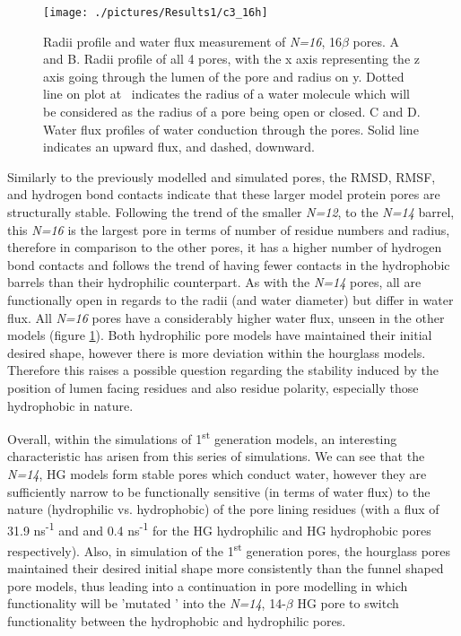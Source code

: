 \begin{figure}[H]
\begin{center}
\texttt{[image: ./pictures/Results1/c3\_16h]}
\caption[Radii profile and water flux measurement of \textit{N=16}, 16$\beta$ pores.] {Radii profile and water flux measurement of \textit{N=16}, 16$\beta$ pores. A and B. Radii profile of all 4 pores, with the x axis representing the z axis going through the lumen of the pore and radius on y. Dotted line on plot at  \angstrom\ indicates the radius of a water molecule which will be considered as the radius of a pore being open or closed. C and D. Water flux profiles of water conduction through the pores. Solid line indicates an upward flux, and dashed, downward.}
\label{fig:c3_16h}
\end{center}
\end{figure}


Similarly to the previously modelled and simulated pores, the RMSD, RMSF, and hydrogen bond contacts indicate that these larger model protein pores are structurally stable. Following the trend of the smaller \textit{N=12}, to the \textit{N=14} barrel, this \textit{N=16} is the largest pore in terms of number of residue numbers and radius, therefore in comparison to the other pores, it has a higher number of hydrogen bond contacts and follows the trend of having fewer contacts in the hydrophobic barrels than their hydrophilic counterpart. As with the \textit{N=14} pores, all are functionally open in regards to the radii (and water diameter) but differ in water flux. All \textit{N=16} pores have a considerably higher water flux, unseen in the other models (figure \ref{fig:c3_16h}). Both hydrophilic pore models have maintained their initial desired shape, however there is more deviation within the hourglass models. Therefore this raises a possible question regarding the stability induced by the position of lumen facing residues and also residue polarity, especially those hydrophobic in nature. 

Overall, within the simulations of 1\textsuperscript{st} generation models, an interesting characteristic has arisen from this series of simulations. We can see that the \textit{N=14}, HG models form stable pores which conduct water, however they are sufficiently narrow to be functionally sensitive (in terms of water flux) to the nature (hydrophilic vs. hydrophobic) of the pore lining residues (with a flux of 31.9 ns\textsuperscript{-1} and and 0.4 ns\textsuperscript{-1} for the HG hydrophilic and HG hydrophobic pores respectively). Also, in simulation of the  1\textsuperscript{st} generation pores, the hourglass pores maintained their desired initial shape more consistently than the funnel shaped pore models, thus leading into a continuation in pore modelling in which functionality will be 'mutated ' into the \textit{N=14}, 14-$\beta$ HG pore to switch functionality between the hydrophobic and hydrophilic pores. 

